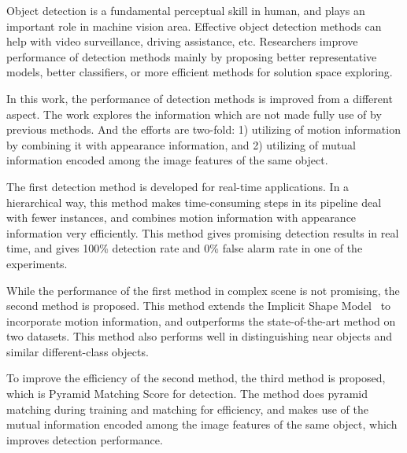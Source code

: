 \begin{eabstract}

\normalsize{
Object detection is a fundamental perceptual skill in human, and plays an important role in machine vision area. Effective object detection methods can help with video surveillance, driving assistance, etc. Researchers improve performance of detection methods mainly by proposing better representative models, better classifiers, or more efficient methods for  solution space exploring.

In this work, the performance of detection methods is improved from a different aspect. The work explores the information which are not made fully use of by previous methods. And the efforts are two-fold: 1) utilizing of motion information by combining it   with appearance information, and 2) utilizing of mutual information encoded among the image features of the same object.

The first detection method is developed for real-time applications. In a hierarchical way, this method makes time-consuming steps in its pipeline deal with fewer instances, and combines motion information with appearance information very efficiently. This method gives promising detection results in real time, and gives 100\% detection rate and 0\% false alarm rate in one of the experiments.

While the performance of the first method in complex scene is not promising, the second method is proposed. This method extends the Implicit Shape Model~\cite{lb1} to incorporate motion information, and outperforms the state-of-the-art method on two datasets. This method also performs well in distinguishing near objects and similar different-class objects.

To improve the efficiency of the second method, the third method is proposed, which is Pyramid Matching Score for detection. The method does pyramid matching during training and matching for efficiency, and makes use of the mutual information encoded among the image features of the same object, which improves detection performance.}
\newpage
\end{eabstract}



